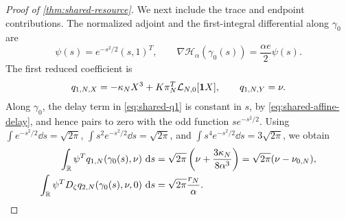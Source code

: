 \begin{proof}[Proof of \cref{thm:shared-resource}]
We next include the trace and endpoint contributions.  The normalized
adjoint and the first-integral differential along \(\gamma_0\) are
\begin{equation}
 \psi(s)=e^{-s^2/2}(s,1)^T,\qquad
 \nabla\mathscr H_\alpha(\gamma_0(s))
       =\frac{\alpha e}{2}\psi(s).                    \label{eq:shared-adjoint}
\end{equation}
The first reduced coefficient is
\begin{equation}
 q_{1,N,X}=-\kappa_NX^3
          +K\pi_N^T\mathcal L_{N,0}[\mathbf1X],\qquad
 q_{1,N,Y}=\nu.                                       \label{eq:shared-q1}
\end{equation}
Along \(\gamma_0\), the delay term in \cref{eq:shared-q1} is constant in
\(s\), by \cref{eq:shared-affine-delay}, and hence pairs to zero with the
odd function \(se^{-s^2/2}\).  Using
\(\int e^{-s^2/2}\dd s=\sqrt{2\pi}\),
\(\int s^2e^{-s^2/2}\dd s=\sqrt{2\pi}\), and
\(\int s^4e^{-s^2/2}\dd s=3\sqrt{2\pi}\), we obtain
\begin{align}
 \int_\mathbb R\psi^Tq_{1,N}(\gamma_0(s),\nu)\,\,\mathrm d s
 &=\sqrt{2\pi}\left(\nu+\frac{3\kappa_N}{8\alpha^3}\right)
 =\sqrt{2\pi}(\nu-\nu_{0,N}),                        \label{eq:shared-leading-gap}\\
 \int_\mathbb R\psi^TD_\zeta q_{2,N}(\gamma_0(s),\nu,0)\,\,\mathrm d s
 &=\sqrt{2\pi}\frac{r_N}{\alpha}.                    \label{eq:shared-melnikov}
\end{align}


\end{proof}
